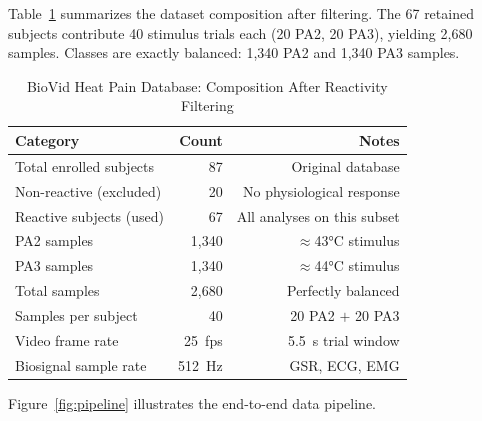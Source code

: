\documentclass[10pt, twocolumn]{article}
\begin{document}
Table~\ref{tab:dataset} summarizes the dataset composition after filtering. The 67 retained
subjects contribute 40 stimulus trials each (20 PA2, 20 PA3), yielding 2,680 samples.
Classes are exactly balanced: 1,340 PA2 and 1,340 PA3 samples.

\begin{table}[ht]
\centering
\caption{BioVid Heat Pain Database: Composition After Reactivity Filtering}
\label{tab:dataset}
\small
\begin{tabular}{lrr}
\toprule
\textbf{Category} & \textbf{Count} & \textbf{Notes} \\
\midrule
Total enrolled subjects & 87 & Original database \\
Non-reactive (excluded) & 20 & No physiological response \\
Reactive subjects (used) & 67 & All analyses on this subset \\
\midrule
PA2 samples & 1,340 & $\approx$43°C stimulus \\
PA3 samples & 1,340 & $\approx$44°C stimulus \\
Total samples & 2,680 & Perfectly balanced \\
\midrule
Samples per subject & 40 & 20 PA2 $+$ 20 PA3 \\
Video frame rate & 25~fps & 5.5~s trial window \\
Biosignal sample rate & 512~Hz & GSR, ECG, EMG \\
\bottomrule
\end{tabular}
\end{table}

Figure~\ref{fig:pipeline} illustrates the end-to-end data pipeline.
\end{document}
